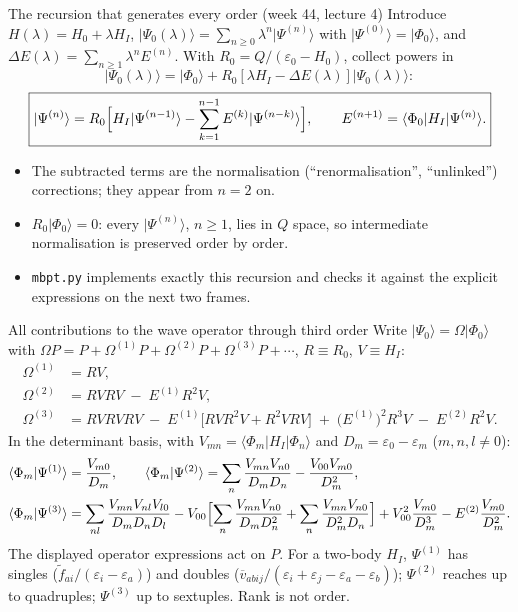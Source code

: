 \documentclass[aspectratio=169,10pt]{beamer}
\newcommand{\ket}[1]{\vert #1\rangle}
\newcommand{\mel}[3]{\langle #1\lvert #2\rvert #3\rangle}
\newcommand{\vbar}[4]{\overline v_{#1#2#3#4}}
\newcommand{\ph}{\Phi_0}
\newcommand{\Psizero}{\Psi_0}
\newcommand{\ftil}[1]{\tilde f_{#1}}
\begin{document}
\begin{frame}{The recursion that generates every order (week 44, lecture 4)}
Introduce $H(\lambda)=H_0+\lambda H_I$, $\ket{\Psizero(\lambda)}=\sum_{n\ge0}\lambda^n\ket{\Psi^{(n)}}$ with $\ket{\Psi^{(0)}}=\ket{\ph}$, and $\Delta E(\lambda)=\sum_{n\ge1}\lambda^n E^{(n)}$. With $R_0=Q/(\varepsilon_0-H_0)$, collect powers in
\[
\ket{\Psizero(\lambda)}=\ket{\ph}+R_0[\lambda H_I-\Delta E(\lambda)]\ket{\Psizero(\lambda)}:
\]
\[
\boxed{\ket{\Psi^{(n)}}=R_0\Bigl[H_I\ket{\Psi^{(n-1)}}-\sum_{k=1}^{n-1}E^{(k)}\ket{\Psi^{(n-k)}}\Bigr],
\qquad
E^{(n+1)}=\mel{\ph}{H_I}{\Psi^{(n)}}.}
\]
\begin{itemize}
\item The subtracted terms are the normalisation (``renormalisation'', ``unlinked'') corrections; they appear from \(n=2\) on.
\item \(R_0\ket{\ph}=0\): every \(\ket{\Psi^{(n)}}\), \(n\ge1\), lies in \(Q\) space, so intermediate normalisation is preserved order by order.
\item \texttt{mbpt.py} implements exactly this recursion and checks it against the explicit expressions on the next two frames.
\end{itemize}
\end{frame}

\begin{frame}[shrink=5]{All contributions to the wave operator through third order}
Write \(\ket{\Psizero}=\Omega\ket{\ph}\) with \(\Omega P=P+\Omega^{(1)}P+\Omega^{(2)}P+\Omega^{(3)}P+\cdots\), \(R\equiv R_0\), \(V\equiv H_I\):
\begin{align*}
\Omega^{(1)}&=RV,\\[2pt]
\Omega^{(2)}&=RVRV\;-\;E^{(1)}R^2V,\\[2pt]
\Omega^{(3)}&=RVRVRV\;-\;E^{(1)}\bigl[RVR^2V+R^2VRV\bigr]\;+\;\bigl(E^{(1)}\bigr)^2R^3V\;-\;E^{(2)}R^2V .
\end{align*}
In the determinant basis, with \(V_{mn}=\mel{\Phi_m}{H_I}{\Phi_n}\) and \(D_m=\varepsilon_0-\varepsilon_m\) (\(m,n,l\ne0\)):
\begin{align*}
\langle\Phi_m|\Psi^{(1)}\rangle&=\frac{V_{m0}}{D_m},\qquad
\langle\Phi_m|\Psi^{(2)}\rangle=\sum_{n}\frac{V_{mn}V_{n0}}{D_mD_n}-\frac{V_{00}V_{m0}}{D_m^2},\\
\langle\Phi_m|\Psi^{(3)}\rangle&=\sum_{nl}\frac{V_{mn}V_{nl}V_{l0}}{D_mD_nD_l}
-V_{00}\Bigl[\sum_n\frac{V_{mn}V_{n0}}{D_mD_n^2}+\sum_n\frac{V_{mn}V_{n0}}{D_m^2D_n}\Bigr]
+V_{00}^2\frac{V_{m0}}{D_m^3}
-E^{(2)}\frac{V_{m0}}{D_m^2}.
\end{align*}
\small The displayed operator expressions act on $P$. For a two-body \(H_I\), \(\Psi^{(1)}\) has singles (\(\ftil{ai}/(\varepsilon_i-\varepsilon_a)\)) and doubles (\(\vbar{a}{b}{i}{j}/(\varepsilon_i+\varepsilon_j-\varepsilon_a-\varepsilon_b)\)); \(\Psi^{(2)}\) reaches up to quadruples; \(\Psi^{(3)}\) up to sextuples. Rank is not order.
\end{frame}
\end{document}
